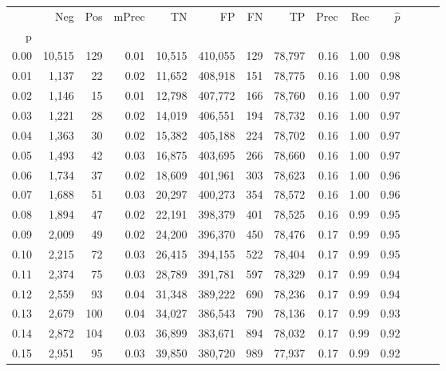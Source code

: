 \begin{tabular}{rrrrrrrrrrrrrr}
\toprule
{} &     Neg &    Pos & mPrec &       TN &       FP &      FN &      TP &  Prec &   Rec & $\hat{p}$ \\
p    &         &        &       &          &          &         &         &       &       &           \\
\midrule
0.00 &  10,515 &    129 &  0.01 &   10,515 &  410,055 &     129 &  78,797 &  0.16 &  1.00 &      0.98 \\
0.01 &   1,137 &     22 &  0.02 &   11,652 &  408,918 &     151 &  78,775 &  0.16 &  1.00 &      0.98 \\
0.02 &   1,146 &     15 &  0.01 &   12,798 &  407,772 &     166 &  78,760 &  0.16 &  1.00 &      0.97 \\
0.03 &   1,221 &     28 &  0.02 &   14,019 &  406,551 &     194 &  78,732 &  0.16 &  1.00 &      0.97 \\
0.04 &   1,363 &     30 &  0.02 &   15,382 &  405,188 &     224 &  78,702 &  0.16 &  1.00 &      0.97 \\
0.05 &   1,493 &     42 &  0.03 &   16,875 &  403,695 &     266 &  78,660 &  0.16 &  1.00 &      0.97 \\
0.06 &   1,734 &     37 &  0.02 &   18,609 &  401,961 &     303 &  78,623 &  0.16 &  1.00 &      0.96 \\
0.07 &   1,688 &     51 &  0.03 &   20,297 &  400,273 &     354 &  78,572 &  0.16 &  1.00 &      0.96 \\
0.08 &   1,894 &     47 &  0.02 &   22,191 &  398,379 &     401 &  78,525 &  0.16 &  0.99 &      0.95 \\
0.09 &   2,009 &     49 &  0.02 &   24,200 &  396,370 &     450 &  78,476 &  0.17 &  0.99 &      0.95 \\
0.10 &   2,215 &     72 &  0.03 &   26,415 &  394,155 &     522 &  78,404 &  0.17 &  0.99 &      0.95 \\
0.11 &   2,374 &     75 &  0.03 &   28,789 &  391,781 &     597 &  78,329 &  0.17 &  0.99 &      0.94 \\
0.12 &   2,559 &     93 &  0.04 &   31,348 &  389,222 &     690 &  78,236 &  0.17 &  0.99 &      0.94 \\
0.13 &   2,679 &    100 &  0.04 &   34,027 &  386,543 &     790 &  78,136 &  0.17 &  0.99 &      0.93 \\
0.14 &   2,872 &    104 &  0.03 &   36,899 &  383,671 &     894 &  78,032 &  0.17 &  0.99 &      0.92 \\
0.15 &   2,951 &     95 &  0.03 &   39,850 &  380,720 &     989 &  77,937 &  0.17 &  0.99 &      0.92 \\

\end{tabular}
